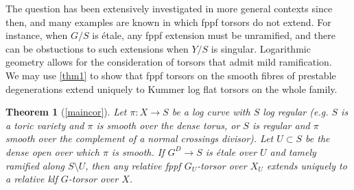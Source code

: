 \documentclass[a4paper,11pt]{amsart} %
\numberwithin{equation}{subsection}
\theoremstyle{definition}
\theoremstyle{plain}%
\newtheorem{theorem}[definition]{Theorem}
\theoremstyle{remark}
\begin{document}
The question has been extensively investigated in more general contexts since then, and many examples are known in which fppf torsors do not extend. For instance, when $G/S$ is étale, any fppf extension must be unramified, and there can be obstuctions to such extensions when $Y/S$ is singular. Logarithmic geometry allows for the consideration of torsors that admit mild ramification.\\


We may use \ref{thm1} to show that fppf torsors on the smooth fibres of prestable degenerations extend uniquely to Kummer log flat torsors on the whole family.
 
 


\begin{theorem}[\ref{maincor}]\label{thm2}
Let $\pi \colon X \to S$ be a log curve with $S$ log regular (e.g. $S$ is a toric variety and $\pi$ is smooth over the dense torus, or $S$ is regular and $\pi$ smooth over the complement of a normal crossings divisor). Let $U \subset S$ be the dense open over which $\pi$ is smooth. If $G^D \to S$ is \'etale over $U$ and tamely ramified along $S \setminus U$, then any relative fppf $G_U$-torsor over $X_U$ extends uniquely to a relative klf $G$-torsor over $X$.
\end{theorem}
\end{document}
